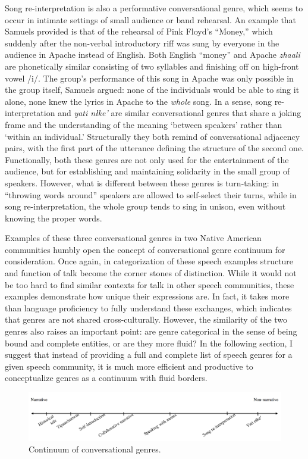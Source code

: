 \documentclass[12pt]{article}
\begin{document}
Song re-interpretation is also a performative conversational genre, which seems to occur in intimate settings of small audience or band rehearsal. An example that Samuels provided is that of the rehearsal of Pink Floyd's ``Money,'' which suddenly after the non-verbal introductory riff was sung by everyone in the audience in Apache instead of English. Both English ``money'' and Apache \textit{zhaali} are phonetically similar consisting of two syllables and finishing off on high-front vowel /i/. The group's performance of this song in Apache was only possible in the group itself, Samuels argued: none of the individuals would be able to sing it alone, none knew the lyrics in Apache to the \textit{whole} song. In a sense, song re-interpretation and \textit{yati n\l ke'} are similar conversational genres that share a joking frame and the understanding of the meaning `between speakers' rather than `within an individual.' Structurally they both remind of conversational adjacency pairs, with the first part of the utterance defining the structure of the second one. Functionally, both these genres are not only used for the entertainment of the audience, but for establishing and maintaining solidarity in the small group of speakers. However, what is different between these genres is turn-taking: in ``throwing words around'' speakers are allowed to self-select their turns, while in song re-interpretation, the whole group tends to sing in unison, even without knowing the proper words. 

Examples of these three conversational genres in two Native American communities humbly open the concept of conversational genre continuum for consideration. Once again, in categorization of these speech examples structure and function of talk become the corner stones of distinction. While it would not be too hard to find similar contexts for talk in other speech communities, these examples demonstrate how unique their expressions are. In fact, it takes more than language proficiency to fully understand these exchanges, which indicates that genres are not shared cross-culturally. However, the similarity of the two genres also raises an important point: are genre categorical in the sense of being bound and complete entities, or are they more fluid? In the following section, I suggest that instead of providing a full and complete list of speech genres for a given speech community, it is much more efficient and productive to conceptualize genres as a continuum with fluid borders.

\begin{figure}[ht]
\caption{Continuum of conversational genres.}
\label{continuum}
\includegraphics[width=7in]{continuum.png}
\end{figure}
\end{document}
